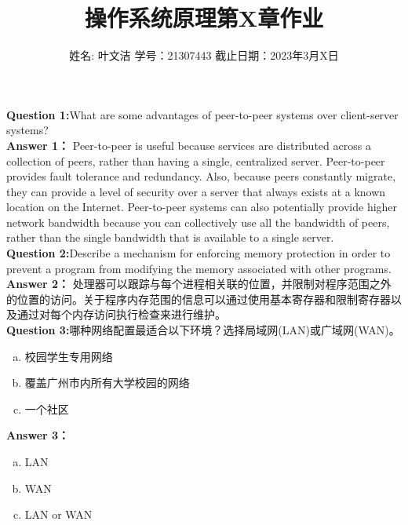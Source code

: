 \documentclass[UTF8]{ctexart}
\title{操作系统原理第X章作业}
\author{姓名: 叶文洁 \quad 学号：21307443 \quad 截止日期：2023年3月X日}
\begin{document}
\maketitle

\noindent \textbf{Question 1:}\quad What are some advantages of peer-to-peer systems over client-server
systems? \\
\noindent \textbf{Answer 1：} Peer-to-peer is useful because services are distributed across a collection
of peers, rather than having a single, centralized server. Peer-to-peer
provides fault tolerance and redundancy. Also, because peers constantly
migrate, they can provide a level of security over a server that always
exists at a known location on the Internet. Peer-to-peer systems can
also potentially provide higher network bandwidth because you can
collectively use all the bandwidth of peers, rather than the single
bandwidth that is available to a single server.\\

\noindent \textbf{Question 2:}\quad Describe a mechanism for enforcing memory protection in order to prevent a program from modifying the memory associated with other programs. \\
\noindent \textbf{Answer 2：} 处理器可以跟踪与每个进程相关联的位置，并限制对程序范围之外的位置的访问。关于程序内存范围的信息可以通过使用基本寄存器和限制寄存器以及通过对每个内存访问执行检查来进行维护。\\

\noindent \textbf{Question 3:}\quad 哪种网络配置最适合以下环境？选择局域网(LAN)或广域网(WAN)。
\begin{enumerate}[(a)]
    \item 校园学生专用网络
    \item 覆盖广州市内所有大学校园的网络
    \item 一个社区
\end{enumerate}
\noindent \textbf{Answer 3：} 
\begin{enumerate}[(a)]
    \item LAN 
    \item WAN
    \item LAN or WAN
\end{enumerate}
\end{document}
